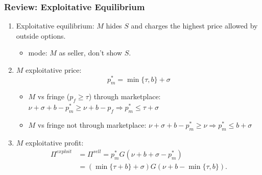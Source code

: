 \begin{frame}
  \frametitle{Review: Exploitative Equilibrium}

    \begin{enumerate}
      \item Exploitative equilibrium: $M$ hides $S$ and charges the highest price allowed by outside options.
      \begin{itemize}
        \item mode: $M$ as seller, don't show $S$.
      \end{itemize}
      \item $M$ exploitative price:
      \begin{equation}\label{eq:exploitative-price}
         p_m^* = \min\{\tau, b\} + \sigma
      \end{equation}
      \begin{itemize}
        \item $M$ vs fringe ($p_f \geq \tau$) through marketplace: $\nu + \sigma + b - p_m^* \geq \nu + b - p_f  \Rightarrow p_m^* \leq \tau + \sigma$ 
        \item $M$ vs fringe not through marketplace: $\nu + \sigma + b - p_m^* \geq \nu \Rightarrow p_m^* \leq b + \sigma$
      \end{itemize}
      \item $M$ exploitative profit:
      \begin{equation}\label{eq:exploitative-equi}
        \begin{aligned}
          \Pi^{exploit} & = \Pi^{sell} = p^*_m G(\nu+ b + \sigma - p^*_m) \\
          & = (\min\{\tau + b\} + \sigma) G(\nu + b - \min\{\tau, b\}).
        \end{aligned}
      \end{equation}
    \end{enumerate}


\end{frame}
  


